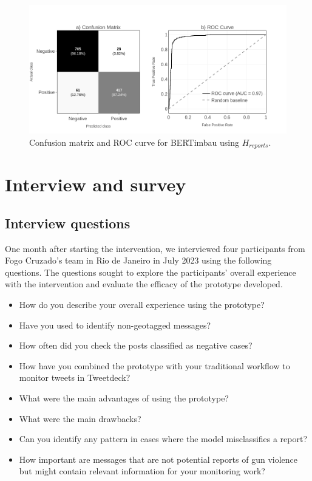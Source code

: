 \documentclass[11pt,letterpaper]{article}
\begin{document}
\begin{figure}[H]
    \centering
    \includegraphics[width=0.7\linewidth]{figs/test_reports_pb.png}
    \caption{Confusion matrix and ROC curve for BERTimbau using $H_{reports}$.}
    \label{fig:eval-hlabel}
\end{figure}

\section{Interview and survey}
\label{app:results}
\subsection{Interview questions}
One month after starting the intervention, we interviewed four participants from Fogo Cruzado's team in Rio de Janeiro in July 2023 using the following questions. The questions sought to explore the participants' overall experience with the intervention and evaluate the efficacy of the prototype developed. 

\begin{itemize}
\item How do you describe your overall experience using the prototype?
\item Have you used to identify non-geotagged messages?
\item How often did you check the posts classified as negative cases?
\item How have you combined the prototype with your traditional workflow to monitor tweets in Tweetdeck?
\item What were the main advantages of using the prototype?
\item What were the main drawbacks?
\item Can you identify any pattern in cases where the model misclassifies a report?
\item How important are messages that are not potential reports of gun violence but might contain relevant information for your monitoring work?
\end{itemize}
\end{document}
